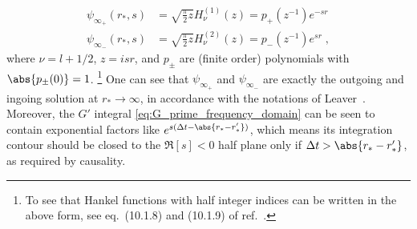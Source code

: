 \begin{align}
  \label{eq:psi_pm_via_Hankel}
  \psi_{\infty_+}(r_*, s)
  &= \sqrt{\frac{\pi}{2} z} H_\nu^{(1)}(z)
  = p_+(z^{-1}) e^{-sr} \nonumber \\
  \psi_{\infty_-}(r_*, s)
  &= \sqrt{\frac{\pi}{2} z} H_\nu^{(2)}(z)
  =  p_-(z^{-1}) e^{sr} \;,
  \end{align}
where $\nu = l+1/2$, $z=isr$, and $p_\pm$ are (finite order) polynomials with $\abs{p_\pm(0)} = 1$.
\footnote{To see that Hankel functions with half integer indices can be written in the above form, see eq.~(10.1.8) and (10.1.9) of ref.~\cite{abramowitz+stegun}.}
One can see that $\psi_{\infty_+}$ and $\psi_{\infty_-}$ are exactly the outgoing and ingoing solution at $r_* \to \infty$, in accordance with the notations of Leaver~\cite{Leaver:1986gd}.
Moreover, the $G'$ integral \eqref{eq:G_prime_frequency_domain} can be seen to contain exponential factors like $e^{s(\Delta{t} - \abs{r_* - r_*'})}$, which means its integration contour should be closed to the $\Re[s] < 0$ half plane only if $\Delta{t} > \abs{r_* - r_*'}$, as required by causality.



